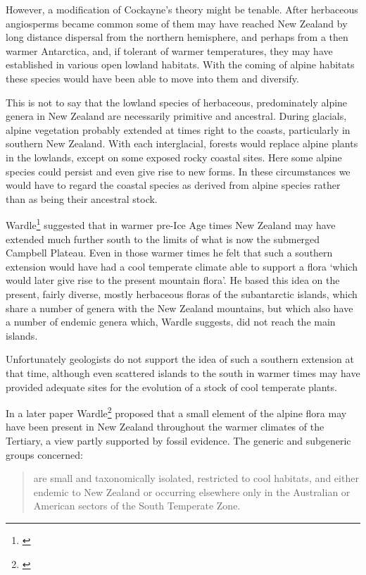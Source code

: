 However, a modification of Cockayne's theory might be tenable.
After herbaceous angiosperms became common some of them may have reached New Zealand by long distance dispersal from the northern hemisphere, and perhaps from a then warmer Antarctica, and, if tolerant of warmer temperatures, they may have established in various open lowland habitats.
With the coming of alpine habitats these species would have been able to move into them and diversify.

This is not to say that the lowland species of herbaceous, predominately alpine genera in New Zealand are necessarily primitive and ancestral.
During glacials, alpine vegetation probably extended at times right to the coasts, particularly in southern New Zealand.
With each interglacial, forests would replace alpine plants in the lowlands, except on some exposed rocky coastal sites.
Here some alpine species could persist and even give rise to new forms.
In these circumstances we would have to regard the coastal species as derived from alpine species rather than as being their ancestral stock.

Wardle\footnote{\cite{wardle1963evolution}} suggested that in warmer pre-Ice Age times New Zealand may have extended much further south to the limits of what is now the submerged Campbell Plateau.
Even in those warmer times he felt that such a southern extension would have had a cool temperate climate able to support a flora `which would later give rise to the present mountain flora'.
He based this idea on the present, fairly diverse, mostly herbaceous floras of the subantarctic islands, which share a number of genera with the New Zealand mountains, but which also have a number of endemic genera which, Wardle suggests, did not reach the main islands.

Unfortunately geologists do not support the idea of such a southern extension at that time, although even scattered islands to the south in warmer times may have provided adequate sites for the evolution of a stock of cool temperate plants.

In a later paper Wardle\footnote{\cite{wardle1968evidence}} proposed that a small element of the alpine flora may have been present in New Zealand throughout the warmer climates of the Tertiary, a view partly supported by fossil evidence.
The generic and subgeneric groups concerned:

\begin{quote}
	are small and taxonomically isolated, restricted to cool habitats, and either endemic to New Zealand or occurring elsewhere only in the Australian or American sectors of the South Temperate Zone.
\end{quote}

